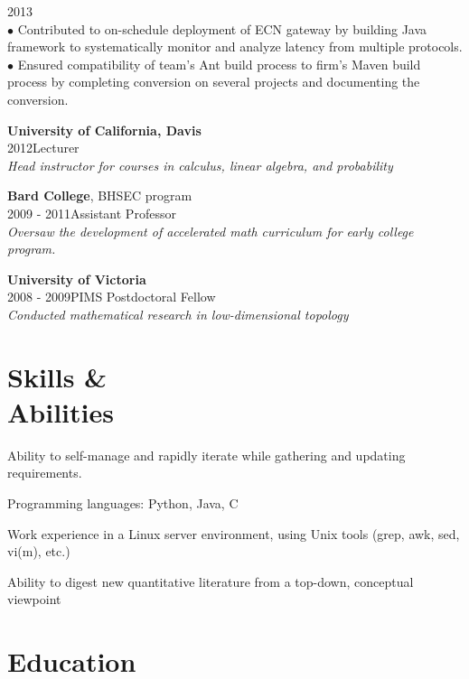 \documentclass[margin]{res}
\begin{document}
\begin{resume}
\begin{list1}
2013 \\[0.05cm]
$\bullet$ Contributed to  on-schedule deployment of ECN gateway by building Java framework to systematically monitor and analyze latency from multiple protocols.\\[0.05cm]
$\bullet$ Ensured compatibility of team's Ant build process to firm's Maven build process by completing conversion on several projects and documenting the conversion.
\\[-0.3cm]
\item {\bf University of California, Davis}\\
2012\qquad Lecturer\\
{\it Head instructor for courses in calculus, linear algebra, and probability}\vspace{0.05cm}
\item {\bf Bard College}, BHSEC program\\
2009 - 2011\qquad Assistant Professor\\
{\it Oversaw the development of accelerated math curriculum for early college program.}\vspace{0.05cm}
\item {\bf University of Victoria}\\
2008 - 2009\qquad PIMS Postdoctoral Fellow\\
{\it Conducted mathematical research in low-dimensional topology}
\end{list1}
\vspace{-0.15in}

\section{\helv Skills \&\\ Abilities}
\begin{list1}
\item Ability to self-manage and rapidly iterate while gathering and updating requirements.
\item Programming languages: {\helv Python}, { \helv Java}, {\helv C}
\item Work experience in a Linux server environment, using Unix tools (grep, awk, sed, vi(m), etc.)
\item Ability to digest new quantitative literature from a top-down, conceptual viewpoint
\end{list1}

\section{Education}\label{education}


\end{resume}
\end{document}
